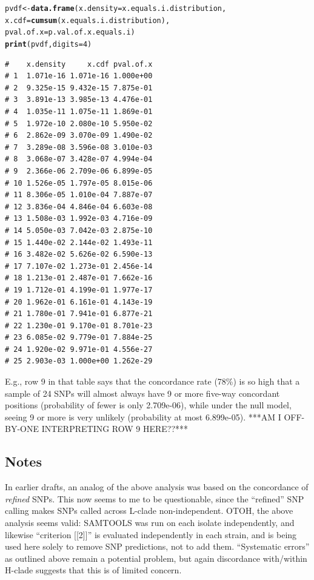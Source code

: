 \documentclass{article}\usepackage[]{graphicx}\usepackage[]{color}
\makeatletter
\newcommand{\hlnum}[1]{\textcolor[rgb]{0.686,0.059,0.569}{#1}}%
\newcommand{\hlstd}[1]{\textcolor[rgb]{0.345,0.345,0.345}{#1}}%
\newcommand{\hlkwb}[1]{\textcolor[rgb]{0.69,0.353,0.396}{#1}}%
\newcommand{\hlkwc}[1]{\textcolor[rgb]{0.333,0.667,0.333}{#1}}%
\newcommand{\hlkwd}[1]{\textcolor[rgb]{0.737,0.353,0.396}{\textbf{#1}}}%
\newenvironment{kframe}{%
 \def\at@end@of@kframe{}%
 \ifinner\ifhmode%
  \def\at@end@of@kframe{\end{minipage}}%
  \begin{minipage}{\columnwidth}%
 \fi\fi%
 \def\FrameCommand##1{\hskip\@totalleftmargin \hskip-\fboxsep
 \colorbox{shadecolor}{##1}\hskip-\fboxsep
     \hskip-\linewidth \hskip-\@totalleftmargin \hskip\columnwidth}%
 \MakeFramed {\advance\hsize-\width
   \@totalleftmargin\z@ \linewidth\hsize
   \@setminipage}}%
 {\par\unskip\endMakeFramed%
 \at@end@of@kframe}
\newenvironment{knitrout}{}{} %
\makeatother
\begin{document}
\begin{enumerate}
\begin{knitrout}\footnotesize
{}\color{fgcolor}\begin{kframe}
\begin{alltt}
\hlstd{pvdf} \hlkwb{<-} \hlkwd{data.frame}\hlstd{(}\hlkwc{x.density}\hlstd{=x.equals.i.distribution,}
                   \hlkwc{x.cdf}\hlstd{=}\hlkwd{cumsum}\hlstd{(x.equals.i.distribution),}
                   \hlkwc{pval.of.x}\hlstd{=p.val.of.x.equals.i)}
\hlkwd{print}\hlstd{(pvdf,} \hlkwc{digits}\hlstd{=}\hlnum{4}\hlstd{)}
\end{alltt}
\begin{verbatim}
#    x.density     x.cdf pval.of.x
# 1  1.071e-16 1.071e-16 1.000e+00
# 2  9.325e-15 9.432e-15 7.875e-01
# 3  3.891e-13 3.985e-13 4.476e-01
# 4  1.035e-11 1.075e-11 1.869e-01
# 5  1.972e-10 2.080e-10 5.950e-02
# 6  2.862e-09 3.070e-09 1.490e-02
# 7  3.289e-08 3.596e-08 3.010e-03
# 8  3.068e-07 3.428e-07 4.994e-04
# 9  2.366e-06 2.709e-06 6.899e-05
# 10 1.526e-05 1.797e-05 8.015e-06
# 11 8.306e-05 1.010e-04 7.887e-07
# 12 3.836e-04 4.846e-04 6.603e-08
# 13 1.508e-03 1.992e-03 4.716e-09
# 14 5.050e-03 7.042e-03 2.875e-10
# 15 1.440e-02 2.144e-02 1.493e-11
# 16 3.482e-02 5.626e-02 6.590e-13
# 17 7.107e-02 1.273e-01 2.456e-14
# 18 1.213e-01 2.487e-01 7.662e-16
# 19 1.712e-01 4.199e-01 1.977e-17
# 20 1.962e-01 6.161e-01 4.143e-19
# 21 1.780e-01 7.941e-01 6.877e-21
# 22 1.230e-01 9.170e-01 8.701e-23
# 23 6.085e-02 9.779e-01 7.884e-25
# 24 1.920e-02 9.971e-01 4.556e-27
# 25 2.903e-03 1.000e+00 1.262e-29
\end{verbatim}
\end{kframe}
\end{knitrout}

E.g., row 9 in that table says that the concordance rate (78\%) is so high that a sample of 24 SNPs will almost always have 9 or more five-way concordant positions (probability of fewer is only 2.709e-06), while under the null model, seeing 9 or more is very unlikely (probability at most 6.899e-05).  
***AM I OFF-BY-ONE INTERPRETING ROW 9 HERE??***  

\end{enumerate}

\subsection{Notes}

In earlier drafts, an analog of the above analysis was based on the concordance of \emph{refined} SNPs.  This now seems to me to be questionable, since the ``refined'' SNP calling makes SNPs called across L-clade non-independent. OTOH, the above analysis seems valid: SAMTOOLS was run on each isolate independently, and likewise ``criterion [[2]]'' is evaluated independently in each strain, and is being used here solely to remove SNP predictions, not to add them.  ``Systematic errors'' as outlined above remain a potential problem, but again discordance with/within H-clade suggests that this is of limited concern.
\end{document}
